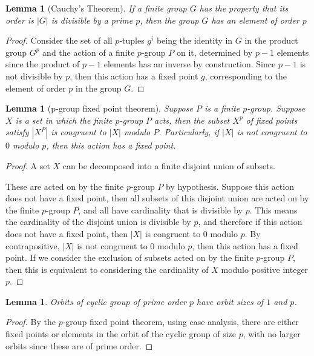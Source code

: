 \documentclass[10pt,twocolumn]{article}
\newtheorem{lemma}[theorem]{Lemma}
\begin{document}
\begin{lemma}[Cauchy's Theorem]
    If a finite group $G$ has the property that its order is $|G|$ is divisible by a prime $p$, then the group $G$ has an element of order $p$
\end{lemma}

\begin{proof}
    Consider the set of all $p$-tuples $g^i$ being the identity in $G$ in the product group $G^p$ and the action of a finite $p$-group $P$ on it, determined by $p - 1$ elements since the product of $p - 1$ elements has an inverse by construction. Since $p - 1$ is not divisible by $p$, then this action has a fixed point $g$, corresponding to the element of order $p$ in the group $G$.
\end{proof}

\begin{lemma}[p-group fixed point theorem]
    Suppose $P$ is a finite $p$-group.
    Suppose $X$ is a set in which the finite $p$-group $P$ acts, then the subset $X^{p}$ of fixed points satisfy $|X^P|$ is congruent to $|X|$ modulo $P$. Particularly, if $|X|$ is not congruent to $0$ modulo $p$, then this action has a fixed point. 
\end{lemma}

\begin{proof}
    A set $X$ can be decomposed into a finite disjoint union of subsets.

    These are acted on by the finite $p$-group $P$ by hypothesis. Suppose this action does not have a fixed point, then all subsets of this disjoint union are acted on by the finite $p$-group $P$, and all have cardinality that is divisible by $p$. This means the cardinality of the disjoint union is divisible by $p$, and therefore if this action does not have a fixed point, then $|X|$ is congruent to $0$ modulo $p$. By contrapositive, $|X|$ is not congruent to $0$ modulo $p$, then this action has a fixed point.
    If we consider the exclusion of subsets acted on by the finite $p$-group $P$, then this is equivalent to considering the cardinality of $X$ modulo positive integer $p$.
\end{proof}

\begin{lemma}
    Orbits of cyclic group of prime order $p$ have orbit sizes of $1$ and $p$.
\end{lemma}

\begin{proof}
    By the $p$-group fixed point theorem, using case analysis, there are either fixed points or elements in the orbit of the cyclic group of size $p$, with no larger orbits since these are of prime order.
\end{proof}
\end{document}
